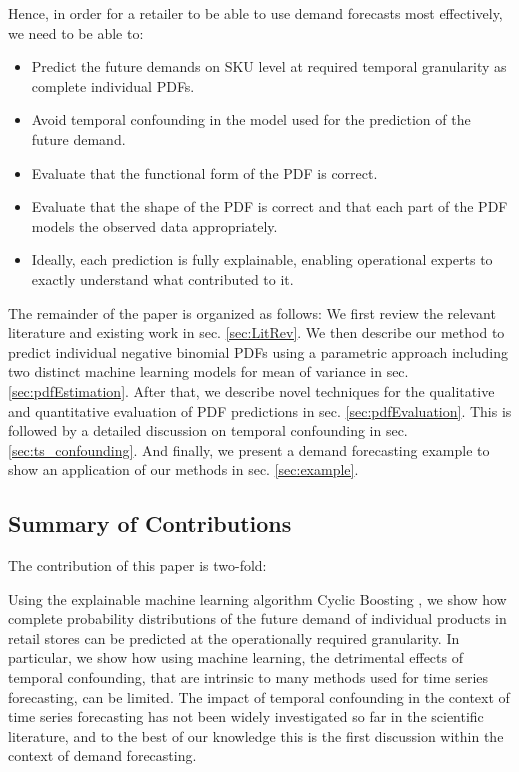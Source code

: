 \documentclass[BCOR=1mm, DIV=calc,10pt,
twoside=true,
twocolumn,
headings=normal]{scrartcl}
\begin{document}
Hence, in order for a retailer to be able to use demand forecasts most effectively, we need to be able to:
\begin{itemize}
	\item {Predict the future demands on SKU level at required temporal granularity as complete individual PDFs.}
	\item {Avoid temporal confounding in the model used for the prediction of the future demand.}
	\item {Evaluate that the functional form of the PDF is correct.}
	\item {Evaluate that the shape of the PDF is correct and that each part of the PDF models the observed data appropriately.}
	\item {Ideally, each prediction is fully explainable, enabling operational experts to exactly understand what contributed to it.}
\end{itemize}

The remainder of the paper is organized as follows: We first review the relevant literature and existing work in sec. \ref{sec:LitRev}. We then describe our method to predict individual negative binomial PDFs using  a parametric approach including two distinct machine learning models for mean of variance in sec. \ref{sec:pdfEstimation}. After that, we describe novel techniques for the qualitative and quantitative evaluation of PDF predictions in sec. \ref{sec:pdfEvaluation}. This is followed by a detailed discussion on temporal confounding in sec. \ref{sec:ts_confounding}. And finally, we present a demand forecasting example to show an application of our methods in sec. \ref{sec:example}.

\subsection*{Summary of Contributions}

The contribution of this paper is two-fold:

Using the explainable machine learning algorithm Cyclic Boosting \cite{Wick2019}, we show how complete probability distributions of the future demand of individual products in retail stores can be predicted at the operationally required granularity. In particular, we show how using machine learning, the detrimental effects of temporal confounding, that are intrinsic to many methods used for time series forecasting, can be limited. The impact of temporal confounding in the context of time series forecasting has not been widely investigated so far in the scientific literature, and to the best of our knowledge this is the first discussion within the context of demand forecasting.
\end{document}

